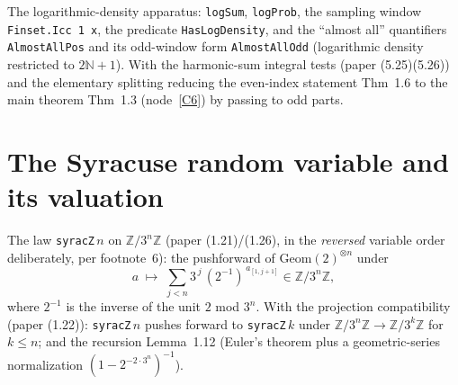 \begin{definition}\label{C3}
  \leanok
The logarithmic-density apparatus: \texttt{logSum}, \texttt{logProb}, the sampling window
\texttt{Finset.Icc 1 x}, the predicate \texttt{HasLogDensity}, and the ``almost all''
quantifiers \texttt{AlmostAllPos} and its odd-window form \texttt{AlmostAllOdd}
(logarithmic density restricted to \(2\mathbb{N}+1\)).  With the harmonic-sum integral tests
(paper (5.25)(5.26)) and the elementary splitting reducing the even-index statement
Thm~1.6 to the main theorem Thm~1.3 (node~\ref{C6}) by passing to odd parts.
\end{definition}


\chapter{The Syracuse random variable and its valuation}\label{chp:syracuse}

\begin{definition}\label{C4}
  \leanok
The law \texttt{syracZ}\,\(n\) on \(\mathbb{Z}/3^n\mathbb{Z}\) (paper (1.21)/(1.26), in the
\emph{reversed} variable order deliberately, per footnote~6): the pushforward of
\(\mathrm{Geom}(2)^{\otimes n}\) under
\[
  a \;\longmapsto\; \sum_{j<n} 3^{\,j}\,(2^{-1})^{\,a_{[1,j+1]}} \in \mathbb{Z}/3^n\mathbb{Z},
\]
where \(2^{-1}\) is the inverse of the unit \(2\) mod \(3^n\).  With the projection
compatibility (paper (1.22)): \texttt{syracZ}\,\(n\) pushes forward to \texttt{syracZ}\,\(k\)
under \(\mathbb{Z}/3^n\mathbb{Z}\to\mathbb{Z}/3^k\mathbb{Z}\) for \(k\le n\); and the recursion
Lemma~1.12 (Euler's theorem plus a geometric-series normalization
\((1-2^{-2\cdot 3^n})^{-1}\)).
\end{definition}

